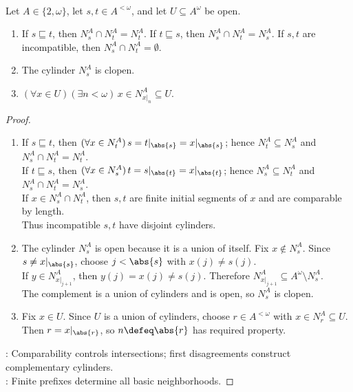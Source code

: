 \begin{proposition} \label{prop:basic-cylinders-form-clopen-basis} \\
Let $A\in\{2,\omega\}$, let $s,t\in A^{<\omega}$, and let $U\subseteq A^\omega$ be open.
\begin{enumerate}[label=(\roman*)]
\setlength{\itemsep}{0pt}
\item If $s\sqsubseteq t$, then $N_s^A\cap N_t^A=N_t^A$. If $t\sqsubseteq s$, then $N_s^A\cap N_t^A=N_s^A$. If $s,t$ are incompatible, then $N_s^A\cap N_t^A=\emptyset$.
\item The cylinder $N_s^A$ is clopen.
\item $(\forall x\in U)(\exists n<\omega)\,x\in N_{x|_n}^A\subseteq U$.
\end{enumerate}
\begin{proof}
\begin{enumerate}[label=(\roman*)]
\setlength{\itemsep}{0pt}
\item If $s\sqsubseteq t$, then $(\forall x\in N_t^A)\,s=t|_{\abs{s}}=x|_{\abs{s}}$; hence $N_t^A\subseteq N_s^A$ and $N_s^A\cap N_t^A=N_t^A$.\\
If $t\sqsubseteq s$, then $(\forall x\in N_s^A)\,t=s|_{\abs{t}}=x|_{\abs{t}}$; hence $N_s^A\subseteq N_t^A$ and $N_s^A\cap N_t^A=N_s^A$.\\
If $x\in N_s^A\cap N_t^A$, then $s,t$ are finite initial segments of $x$ and are comparable by length.\\
Thus incompatible $s,t$ have disjoint cylinders.
\item The cylinder $N_s^A$ is open because it is a union of itself. Fix $x\notin N_s^A$. Since $s\neq x|_{\abs{s}}$, choose $j<\abs{s}$ with $x(j)\neq s(j)$.\\
If $y\in N_{x|_{j+1}}^A$, then $y(j)=x(j)\neq s(j)$. Therefore $N_{x|_{j+1}}^A\subseteq A^\omega\setminus N_s^A$.\\
The complement is a union of cylinders and is open, so $N_s^A$ is clopen.
\item Fix $x\in U$. Since $U$ is a union of cylinders, choose $r\in A^{<\omega}$ with $x\in N_r^A\subseteq U$. Then $r=x|_{\abs{r}}$, so $n\defeq\abs{r}$ has required property.
\end{enumerate}
: Comparability controls intersections; first disagreements construct complementary cylinders.\\
: Finite prefixes determine all basic neighborhoods.
\end{proof}
\end{proposition}

